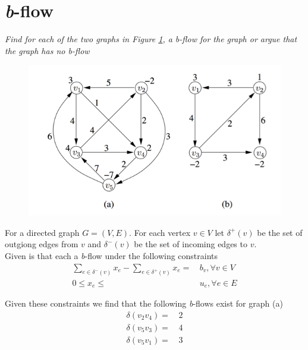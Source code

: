 \section{\textit{b}-flow}
\textit{Find for each of the two graphs in Figure \ref{fig:bflow}, a b-flow for the graph or argue that the graph has no b-flow}
\begin{figure}[h]
  \centering
  \includegraphics[scale=0.4]{images/bflow_graphs.png}
  \label{fig:bflow}
\end{figure}

For a directed graph \(G=(V,E)\). For each vertex \(v \in V\) let \(\delta^+(v)\) be the set of outgiong edges from \(v\) and \(\delta^-(v)\) be the set of incoming edges to \(v\).\\
Given is that each a \textit{b}-flow under the following constraints
\begin{align}
  \sum_{e\in \delta^-(v)} x_e - \sum_{e\in \delta^+(v)} x_e =&\, b_v, \forall v \in V\label{eqn:const1}\\
  0 \leq x_e \leq&\, u_e, \forall e \in E\label{eqn:const2}
\end{align}

\noindent Given these constraints we find that the following \textit{b}-flows exist for graph (a)
\begin{align*}
  \delta (v_2v_4) =&\, 2\\
  \delta (v_5v_3) =&\, 4\\
  \delta (v_5v_1) =&\, 3
\end{align*}

